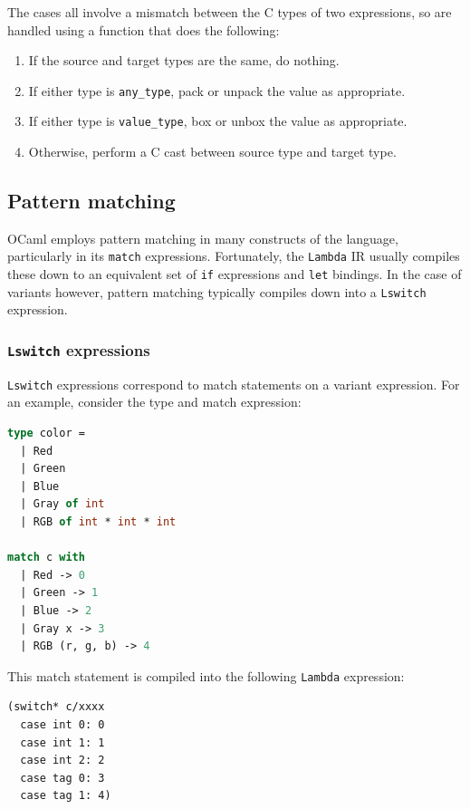 The cases all involve a mismatch between the C types of two expressions, so are
handled using a function that does the following:

\begin{enumerate}

\item If the source and target types are the same, do nothing.

\item If either type is \verb|any_type|, pack or unpack the value as
    appropriate. 

\item If either type is \verb|value_type|, box or unbox the value as
    appropriate.

\item Otherwise, perform a C cast between source type and target type.

\end{enumerate}

\subsection{Pattern matching}

OCaml employs pattern matching in many constructs of the language, particularly
in its \texttt{match} expressions. Fortunately, the \texttt{Lambda} IR usually
compiles these down to an equivalent set of \texttt{if} expressions and
\texttt{let} bindings. In the case of variants however, pattern matching
typically compiles down into a \texttt{Lswitch} expression.

\subsubsection{\texttt{Lswitch} expressions}

\texttt{Lswitch} expressions correspond to match statements on a variant 
expression. For an example, consider the type and match expression:

\begin{lstlisting}[language=Caml]
type color =
  | Red
  | Green
  | Blue
  | Gray of int
  | RGB of int * int * int

match c with
  | Red -> 0
  | Green -> 1
  | Blue -> 2
  | Gray x -> 3
  | RGB (r, g, b) -> 4
\end{lstlisting}

This match statement is compiled into the following \texttt{Lambda} expression:

\begin{lstlisting}
(switch* c/xxxx
  case int 0: 0
  case int 1: 1
  case int 2: 2
  case tag 0: 3
  case tag 1: 4)
\end{lstlisting}

